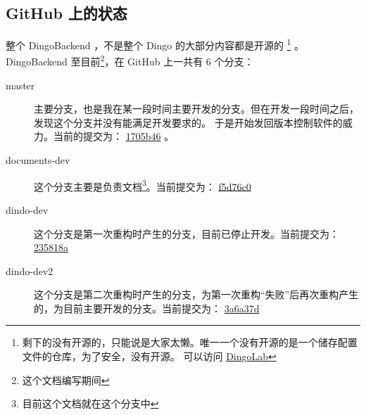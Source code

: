 \documentclass{dindo}
\begin{document}
  \subsection*{GitHub 上的状态}
    整个 DingoBackend ，不是整个 Dingo 的大部分内容都是开源的
      \footnote{剩下的没有开源的，只能说是大家太懒。唯一一个没有开源的是一个储存配置文件的仓库，为了安全，没有开源。
      可以访问 \href{https://github.com/DingoLab}{DingoLab}}
    。DingoBackend 至目前\footnote{这个文档编写期间}，在 GitHub 上一共有 6 个分支：
    \begin{description}
      \item[master] 主要分支，也是我在某一段时间主要开发的分支。但在开发一段时间之后，发现这个分支并没有能满足开发要求的。
        于是开始发回版本控制软件的威力。当前的提交为：
        \href{https://github.com/DingoLab/DingoBackend/commit/1705b461b8c2d9aa2245c2725006771ad8065995}{1705b46}
        。
      \item[documents-dev] 这个分支主要是负责文档\footnote{目前这个文档就在这个分支中}。当前提交为：
        \href{https://github.com/DingoLab/DingoBackend/commit/f5d76c0fc408337203fc1fd54393ef41372ac4ea}{f5d76c0}
      \item[dindo-dev] 这个分支是第一次重构时产生的分支，目前已停止开发。当前提交为：
        \href{https://github.com/DingoLab/DingoBackend/commit/235818a90dff38b8276ce53233c0cdaaff7acdf0}{235818a}
      \item[dindo-dev2] 这个分支是第二次重构时产生的分支，为第一次重构“失败”后再次重构产生的，为目前主要开发的分支。当前提交为：
        \href{https://github.com/DingoLab/DingoBackend/commit/3a6a37d1183b270685cee25ad031e707e5e3b7fd}{3a6a37d}
      \item[]
    \end{description}
\end{document}
